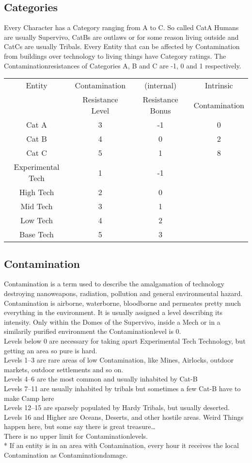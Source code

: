 \subsection{Categories}
Every Character has a Category ranging from A to C. So called CatA Humans are usually Supervivo, CatBs are outlaws or
for some reason living outside and CatCs are usually Tribals.
Every Entity that can be affected by Contamination from buildings over technology to living things have Category ratings.
The Contaminationresistances of Categories A, B and C are -1, 0 and 1 respectively.\par\vspace{1.5cm}
\begin{tabular}{c|ccc}
    Entity & Contamination  & (internal) & Intrinsic\\
    & Resistance Level & Resistance Bonus & Contamination\\
    Cat A & 3 & -1 & 0\\
    Cat B & 4 & 0 & 2\\
    Cat C & 5 & 1 & 8\\
    Experimental Tech & 1 & -1 \\
    High Tech & 2 & 0 \\
    Mid Tech & 3 & 1\\
    Low Tech & 4 & 2 \\
    Base Tech & 5 & 3 \\
\end{tabular}\par\vspace{1.5cm}
\subsection{Contamination}
Contamination is a term used to describe the amalgamation of technology destroying nanoweapons, radiation, pollution
and general environmental hazard.
Contamination is airborne, waterborne, bloodborne and permeates pretty much
everything in the environment.
It is usually assigned a level describing its intensity.
Only within the Domes
of the Supervivo, inside a Mech or in a similarily purified environment the Contaminationlevel is 0. \\
Levels below 0 are necessary for taking apart Experimental Tech Technology, but getting an area so pure is hard.\\
Levels 1--3
are rare areas of low Contamination, like Mines, Airlocks, outdoor markets, outdoor settlements and so on. \\
Levels 4--6
are the most common and usually inhabited by Cat-B\\
Levels 7--11
are usually inhabited by tribals but sometimes a few Cat-B have to make Camp here \\
Levels 12--15
are sparsely populated by Hardy Tribals, but usually deserted.\\
Levels 16 and Higher
are Oceans, Deserts, and other hostile areas.
Weird Things happen here, but some say there is great treasure\ldots\\
There is no upper limit for Contaminationlevels. \\*
If an entity is in an area with Contamination, every hour it receives the local Contamination
as Contaminationdamage.\par
